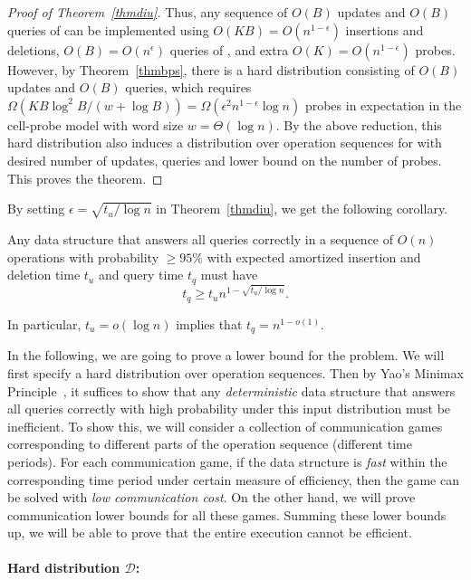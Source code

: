 \documentclass[11pt]{article}
\begin{document}
\begin{proof}[Proof of Theorem~\ref{thmdiu}]
Thus, any sequence of $O(B)$ updates and $O(B)$ queries of \bps{} can be implemented using $O(KB)=O(n^{1-\epsilon})$ insertions and deletions, $O(B)=O(n^{\epsilon})$ queries of \diu{}, and extra $O(K)=O(n^{1-\epsilon})$ probes. However, by Theorem~\ref{thmbps}, there is a hard distribution consisting of $O(B)$ updates and $O(B)$ queries, which requires $\Omega(KB\log^2 B/(w+\log B))=\Omega(\epsilon^2 n^{1-\epsilon}\log n)$ probes in expectation in the cell-probe model with word size $w=\Theta(\log n)$. By the above reduction, this hard distribution also induces a distribution over operation sequences for \diu{} with desired number of updates, queries and lower bound on the number of probes. This proves the theorem. 

\end{proof}

By setting $\epsilon=\sqrt{t_u/\log n}$ in Theorem~\ref{thmdiu}, we get the following corollary. 
\begin{corollary}\label{coldiu}
Any \diu{} data structure that answers all queries correctly in a sequence of $O(n)$ operations with probability $\geq 95\%$ with expected amortized insertion and deletion time $t_u$ and query time $t_q$ must have \[
	t_q\geq t_un^{1-\sqrt{t_u/\log n}}.
\]

In particular, $t_u=o(\log n)$ implies that $t_q=n^{1-o(1)}$. 
\end{corollary}

In the following, we are going to prove a lower bound for the \bps{} problem. We will first specify a hard distribution over operation sequences. Then by Yao's Minimax Principle~\cite{Yao77}, it suffices to show that any \emph{deterministic} data structure that answers all queries correctly with high probability under this input distribution must be inefficient. To show this, we will consider a collection of communication games corresponding to different parts of the operation sequence (different time periods). For each communication game, if the data structure is \emph{fast} within the corresponding time period under certain measure of efficiency, then the game can be solved with \emph{low communication cost}. On the other hand, we will prove communication lower bounds for all these games. Summing these lower bounds up, we will be able to prove that the entire execution cannot be efficient. 

\paragraph*{Hard distribution $\mathcal{D}$:}
\end{document}
